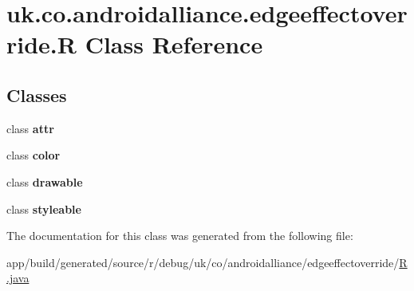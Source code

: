 \hypertarget{classuk_1_1co_1_1androidalliance_1_1edgeeffectoverride_1_1_r}{}\section{uk.\+co.\+androidalliance.\+edgeeffectoverride.\+R Class Reference}
\label{classuk_1_1co_1_1androidalliance_1_1edgeeffectoverride_1_1_r}
\subsection*{Classes}
\begin{DoxyCompactItemize}
\item 
class {\bfseries attr}
\item 
class {\bfseries color}
\item 
class {\bfseries drawable}
\item 
class {\bfseries styleable}
\end{DoxyCompactItemize}


The documentation for this class was generated from the following file\+:\begin{DoxyCompactItemize}
\item 
app/build/generated/source/r/debug/uk/co/androidalliance/edgeeffectoverride/\hyperlink{app_2build_2generated_2source_2r_2debug_2uk_2co_2androidalliance_2edgeeffectoverride_2_r_8java}{R.\+java}\end{DoxyCompactItemize}
